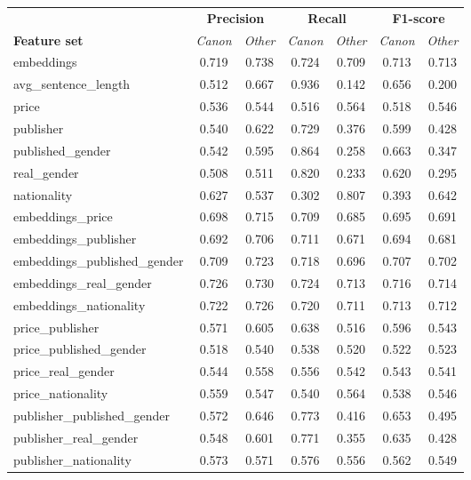 
\begin{table*}
    \centering
    \small
    \begin{tabular}{l|cc|cc|cc}
    \toprule
    & \multicolumn{2}{c|}{\textbf{Precision}} & \multicolumn{2}{c|}{\textbf{Recall}} & \multicolumn{2}{c}{\textbf{F1-score}} \\
    \textbf{Feature set} & \textit{Canon} & \textit{Other} & \textit{Canon}  & \textit{Other} & \textit{Canon}  & \textit{Other} \\
    \midrule
    embeddings & 0.719 & 0.738 & 0.724 & 0.709 & 0.713 & 0.713 \\
    avg_sentence_length & 0.512 & 0.667 & 0.936 & 0.142 & 0.656 & 0.200 \\
    price & 0.536 & 0.544 & 0.516 & 0.564 & 0.518 & 0.546 \\
    publisher & 0.540 & 0.622 & 0.729 & 0.376 & 0.599 & 0.428 \\
    published_gender & 0.542 & 0.595 & 0.864 & 0.258 & 0.663 & 0.347 \\
    real_gender & 0.508 & 0.511 & 0.820 & 0.233 & 0.620 & 0.295 \\
    nationality & 0.627 & 0.537 & 0.302 & 0.807 & 0.393 & 0.642 \\
    embeddings_price & 0.698 & 0.715 & 0.709 & 0.685 & 0.695 & 0.691 \\
    embeddings_publisher & 0.692 & 0.706 & 0.711 & 0.671 & 0.694 & 0.681 \\
    embeddings_published_gender & 0.709 & 0.723 & 0.718 & 0.696 & 0.707 & 0.702 \\
    embeddings_real_gender & 0.726 & 0.730 & 0.724 & 0.713 & 0.716 & 0.714 \\
    embeddings_nationality & 0.722 & 0.726 & 0.720 & 0.711 & 0.713 & 0.712 \\
    price_publisher & 0.571 & 0.605 & 0.638 & 0.516 & 0.596 & 0.543 \\
    price_published_gender & 0.518 & 0.540 & 0.538 & 0.520 & 0.522 & 0.523 \\
    price_real_gender & 0.544 & 0.558 & 0.556 & 0.542 & 0.543 & 0.541 \\
    price_nationality & 0.559 & 0.547 & 0.540 & 0.564 & 0.538 & 0.546 \\
    publisher_published_gender & 0.572 & 0.646 & 0.773 & 0.416 & 0.653 & 0.495 \\
    publisher_real_gender & 0.548 & 0.601 & 0.771 & 0.355 & 0.635 & 0.428 \\
    publisher_nationality & 0.573 & 0.571 & 0.576 & 0.556 & 0.562 & 0.549 \\

\end{tabular}
\end{table*}
